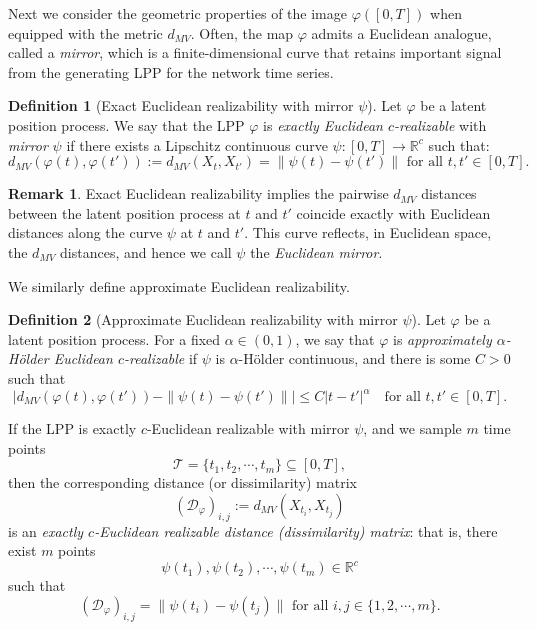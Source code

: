 \documentclass[12pt]{article}
\newcommand{\RR}{\mathbb{R}}
\theoremstyle{definition}
\newtheorem{definition}{Definition}
\newtheorem{remark}{Remark}
\begin{document}
Next we consider the geometric properties of the image $\varphi([0,T])$ when equipped with the metric $d_{MV}$. Often, the map $\varphi$ admits a Euclidean analogue, called a {\em mirror}, which is a finite-dimensional curve that retains important signal from the generating LPP for the network time series. 

\begin{definition}[Exact Euclidean realizability with mirror $\psi$]
Let $\varphi$ be a latent position process. We say that the LPP $\varphi$ is \emph{exactly Euclidean $c$-realizable} with \emph{mirror} $\psi$ if there exists a Lipschitz continuous curve $\psi:[0,T]\rightarrow\RR^c$ such that:
$$
d_{MV}\left(\varphi(t), \varphi(t')\right):=d_{MV}\left(X_t, X_{t'}\right)=\|\psi(t)- \psi(t')\| \text{ for all } t,t' \in [0,T]. 
$$
\end{definition}

\begin{remark}
Exact Euclidean realizability implies the pairwise $d_{MV}$ distances between the latent position process at $t$ and $t'$ coincide exactly with Euclidean distances along the curve $\psi$ at $t$ and $t'$. This curve reflects, in Euclidean space, the $d_{MV}$ distances, and hence we call $\psi$ the {\em Euclidean mirror}.
\end{remark}

We similarly define approximate Euclidean realizability.
\begin{definition}[Approximate Euclidean realizability with mirror $\psi$]
Let $\varphi$ be a latent position process. For a fixed $\alpha \in (0, 1)$, we say that $\varphi$ is \emph{approximately \(\alpha\)-H\"older Euclidean \(c\)-realizable} if $\psi$ is \(\alpha\)-H\"older continuous, and there is some $C > 0$ such that
\[
\biggl| d_{MV}(\varphi(t), \varphi(t')) - \|\psi(t) - \psi(t')\| \biggr| \leq C|t - t'|^\alpha \quad \text{for all } t, t' \in [0, T].
\]
\end{definition}

If the LPP is exactly $c$-Euclidean realizable with mirror $\psi$, and we sample $m$ time points
$$\mathcal{T}=\{t_1,t_2,\cdots,t_m\} \subseteq [0,T],$$ then the corresponding distance (or dissimilarity) matrix $$\left(\mathcal{D}_\varphi\right)_{i,j}:=d_{MV}(X_{t_i},X_{t_j})$$ is an \emph{exactly $c$-Euclidean realizable distance (dissimilarity) matrix}: that is, there exist $m$ points $$\psi(t_1),\psi(t_2),\cdots,\psi(t_m) \in \mathbb{R}^c$$ such that $$\left(\mathcal{D}_\varphi\right)_{i,j}=\|\psi(t_i)-\psi(t_j)\| \text{~for all~} i,j \in \{1,2,\cdots,m\}.$$ 
\end{document}
